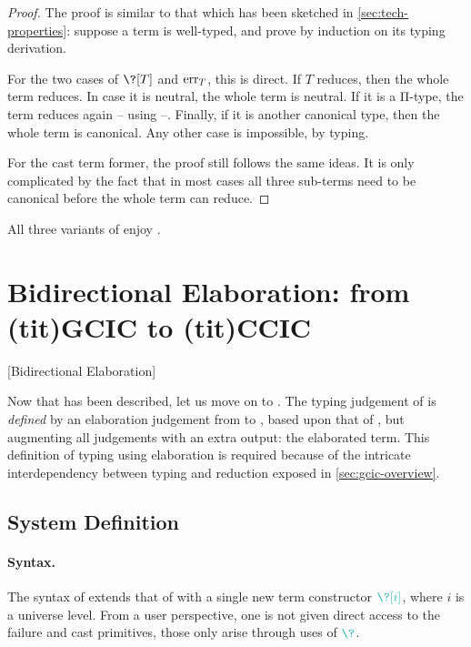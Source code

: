\begin{proof}
  The proof is similar to that which has been sketched in \cref{sec:tech-properties}:
  suppose a term is well-typed, and prove  by induction on its typing derivation.

  For the two cases of $\?[T]$ and $\err[T]$, this is direct.
  If $T$ reduces, then the whole term reduces.
  In case it is neutral, the whole term is neutral. If it is a Π-type, the term reduces
  again – using \eg {} –. Finally, if it is another canonical type,
  then the whole term is canonical. Any other case is impossible, by typing.

  For the cast term former, the proof still follows the same ideas. It is only complicated
  by the fact that in most cases all three sub-terms need to be canonical before the whole
  term can reduce. 
\end{proof}

\begin{theorem}
  \label{thm:ccic-psafe}
  All three variants of  enjoy .
\end{theorem}

\section{Bidirectional Elaboration: from \kl(tit){GCIC} to \kl(tit){CCIC}}
[Bidirectional Elaboration]
\label{sec:elaboration}

Now that  has been described, let us move on to .
The typing judgement of  is \emph{defined}
by an elaboration judgement from  to , based upon
that of , but
augmenting all judgements with an extra output: the elaborated  term.
This definition of typing using elaboration is required because of the intricate interdependency between typing and reduction exposed in \cref{sec:gcic-overview}.

\subsection{System Definition}

\paragraph{Syntax.}
\label{gcic-syntax}
The syntax of %
extends that of  with a single new term constructor $\scol{\?[i]}$,
where $i$ is a universe level. From a user perspective,
one is not given direct access to the failure and cast primitives,
those only arise through uses of $\scol{\?}$.

